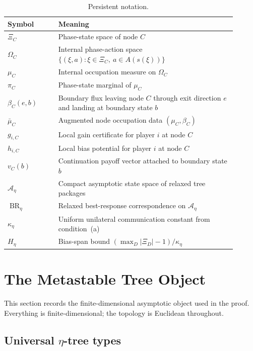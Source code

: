 \documentclass[12pt]{article}
\theoremstyle{definition}
\newcommand{\1}{\mathbf{1}}
\newcommand{\cA}{\mathcal{A}}
\begin{document}
\begin{table}[ht]
\centering
\begin{tabular}{>{\raggedright\arraybackslash}p{0.2\linewidth}
                >{\raggedright\arraybackslash}p{0.7\linewidth}}
\toprule
Symbol & Meaning \\
\midrule
\(\Xi_C\) & Phase-state space of node \(C\) \\
\(\Omega_C\) & Internal phase-action space \(\{(\xi,a):\xi\in \Xi_C,\ a\in A(s(\xi))\}\) \\
\(\mu_C\) & Internal occupation measure on \(\Omega_C\) \\
\(\pi_C\) & Phase-state marginal of \(\mu_C\) \\
\(\beta_C(e,b)\) & Boundary flux leaving node \(C\) through exit direction \(e\) and landing at boundary state \(b\) \\
\(\bar\mu_C\) & Augmented node occupation data \((\mu_C,\beta_C)\) \\
\(g_{i,C}\) & Local gain certificate for player \(i\) at node \(C\) \\
\(h_{i,C}\) & Local bias potential for player \(i\) at node \(C\) \\
\(v_C(b)\) & Continuation payoff vector attached to boundary state \(b\) \\
\(\cA_\eta\) & Compact asymptotic state space of relaxed tree packages \\
\(\operatorname{BR}_\eta\) & Relaxed best-response correspondence on \(\cA_\eta\) \\
\(\kappa_\eta\) & Uniform unilateral communication constant from condition~(a) \\
\(H_\eta\) & Bias-span bound \( (\max_D|\Xi_D|-1)/\kappa_\eta \) \\
\bottomrule
\end{tabular}
\caption{Persistent notation.}
\label{tab:notation}
\end{table}

\section{The Metastable Tree Object}
\label{sec:tree}

This section records the finite-dimensional asymptotic object used in the proof.
Everything is finite-dimensional; the topology is Euclidean throughout.

\subsection{Universal \texorpdfstring{$\eta$}{eta}-tree types}
\end{document}
